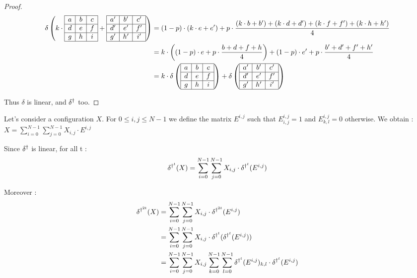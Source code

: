 \begin{question}
\begin{proof}
 \[\begin{split}
 \delta \left( k \cdot \begin{array}{ | c | c | c |} \hline
  a & b & c \\ \hline
  d & e & f \\ \hline
  g & h & i \\ \hline
 \end{array} + \begin{array}{ | c | c | c |} \hline
  a' & b' & c' \\ \hline
  d' & e' & f' \\ \hline
  g' & h' & i' \\ \hline
 \end{array} \right) & = (1-p) \cdot (k \cdot e+e') + p \cdot \frac{(k \cdot b+b')+(k \cdot d+d')+(k \cdot f+f')+(k \cdot h+h')}{4}  \\
		     & = k \cdot \left( (1-p) \cdot e+p \cdot \frac{b+d+f+h}{4} \right) + (1-p) \cdot e'+p \cdot \frac{b'+d'+f'+h'}{4} \\
		     & = k \cdot \delta \left( \begin{array}{ | c | c | c |} \hline
  a & b & c \\ \hline
  d & e & f \\ \hline
  g & h & i \\ \hline
 \end{array} \right) + \delta \left( \begin{array}{ | c | c | c |} \hline
  a' & b' & c' \\ \hline
  d' & e' & f' \\ \hline
  g' & h' & i' \\ \hline
 \end{array} \right)      
 \end{split}\]
 
Thus $\delta$ is linear, and $\delta^{\dag}$ too.
\end{proof}

Let's consider a configuration $X$. For $0 \leq i,j \leq N-1$ we define the matrix $E^{i,j}$ such that $E^{i,j}_{i,j} = 1$ and $E^{i,j}_{k,l} = 0$ otherwise. We obtain : $X = \sum_{i=0}^{N-1} \sum_{j=0}^{N-1} X_{i,j} \cdot E^{i,j}$

Since $\delta^{\dag}$ is linear, for all t : 
\[ \delta^{\dag^t} (X) = \sum_{i=0}^{N-1} \sum_{j=0}^{N-1} X_{i,j} \cdot \delta^{\dag^t} (E^{i,j})\]
 
Moreover : 
\begin{equation}
 \label{expanddelta}
 \begin{split}
    \delta^{\dag^{2t}} (X) & = \sum_{i=0}^{N-1} \sum_{j=0}^{N-1} X_{i,j} \cdot \delta^{\dag^{2t}} (E^{i,j}) \\
		  & = \sum_{i=0}^{N-1} \sum_{j=0}^{N-1} X_{i,j} \cdot \delta^{\dag^t}(\delta^{\dag^t} (E^{i,j})) \\
		  & = \sum_{i=0}^{N-1} \sum_{j=0}^{N-1} X_{i,j} \sum_{k=0}^{N-1} \sum_{l=0}^{N-1} \delta^{\dag^t} (E^{i,j})_{k,l} \cdot \delta^{\dag^t} (E^{i,j})
 \end{split}
\end{equation}
 

\end{question}
